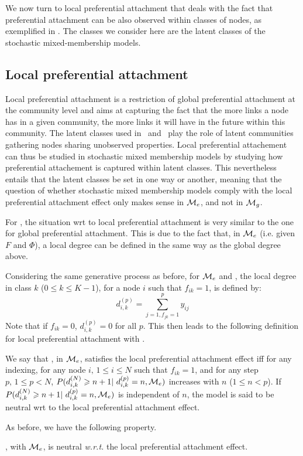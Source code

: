 \vspace{0.1cm}
We now turn to local preferential attachment that deals with the fact that preferential attachment can be also observed within classes of nodes, as exemplified in \cite{LeskovecBKT08}. The classes we consider here are the latent classes of the stochastic mixed-membership models.

\subsection{Local preferential attachment}
\label{sec:local_me}

Local preferential attachment is a restriction of global preferential attachment at the community level and aims at capturing the fact that the more links a node has in a given community, the more links it will have in the future within this community. The latent classes used in \ifm\ and \imb\ play the role of latent communities gathering nodes sharing unobserved properties. Local preferential attachement can thus be studied in stochastic mixed membership models by studying how preferential attachement is captured within latent classes. This nevertheless entails that the latent classes be set in one way or another, meaning that the question of whether stochastic mixed membership models comply with the local preferential attachment effect only makes sense in $\mathcal{M}_e$, and not in $\mathcal{M}_g$.

For \textbf{\ifm}, the situation wrt to local preferential attachment is very similar to the one for global preferential attachment. This is due to the fact that, in $\mathcal{M}_e$ (i.e. given $F$ and $\Phi$), a local degree can be defined in the same way as the global degree above.

Considering the same generative process as before, for $\mathcal{M}_e$ and \ifm, the local degree in class $k$ ($0\leq k\leq K-1$), for a node $i$ such that $f_{ik}=1$, is defined by:
%
\begin{equation*}
d_{i,k}^{(p)} = \sum_{j=1, f_{jk}=1}^p y_{ij}
\end{equation*}
%
Note that if $f_{ik}=0$, $d_{i,k}^{(p)} = 0$ for all $p$. This then leads to the following definition for local preferential attachment with \ifm.
%
\begin{definition}\label{def:locdeg-discrete}
We say that \ifm, in $\mathcal{M}_e$, satisfies the local preferential attachment effect iff for any indexing, for any node $i, \, 1\leq i \leq N$ such that $f_{ik}=1$, and for any step $p, \, 1\leq p < N$, $P(d_{i,k}^{(N)} \geq n+1 | d_{i,k}^{(p)}=n,\M_e)$ increases with $n$ ($1\leq n < p$). If $P(d_{i,k}^{(N)} \geq n+1 | d_{i,k}^{(p)}=n,\M_e)$ is independent of $n$, the model is said to be neutral wrt to the local preferential attachment effect.
\end{definition}
%
As before, we have the following property.
%
\begin{proposition}
\ifm, with $\mathcal{M}_e$, is neutral \textit{w.r.t.} the local preferential attachment effect.
\end{proposition}

